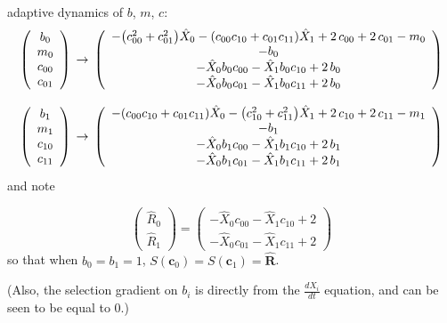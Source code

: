 \documentclass{article}
\begin{document}
adaptive dynamics of $b$, $m$, $c$:
\[\left(\begin{array}{c}
  b_{0}\\
  m_{0}\\
  c_{00}\\
  c_{01}
\end{array}\right)\\
\to\\
\left(\begin{array}{c}
  -{\left({c}_{00}^{2} + {c}_{01}^{2}\right)} \hat{X}_{0} - {\left({c}_{00} {c}_{10} + {c}_{01} {c}_{11}\right)} \hat{X}_{1} + 2 \, {c}_{00} + 2 \, {c}_{01} - m_{0}\\
  -b_{0}\\
  -\hat{X}_{0} b_{0} {c}_{00} - \hat{X}_{1} b_{0} {c}_{10} + 2 \, b_{0}\\
  -\hat{X}_{0} b_{0} {c}_{01} - \hat{X}_{1} b_{0} {c}_{11} + 2 \, b_{0}
\end{array}\right)\]

\[\left(\begin{array}{c}
  b_{1}\\
  m_{1}\\
  c_{10}\\
  c_{11}
\end{array}\right)\\
\to\\
\left(\begin{array}{c}
  -{\left({c}_{00} {c}_{10} + {c}_{01} {c}_{11}\right)} \hat{X}_{0} - {\left({c}_{10}^{2} + {c}_{11}^{2}\right)} \hat{X}_{1} + 2 \, {c}_{10} + 2 \, {c}_{11} - m_{1}\\
  -b_{1}\\
  -\hat{X}_{0} b_{1} {c}_{00} - \hat{X}_{1} b_{1} {c}_{10} + 2 \, b_{1}\\
  -\hat{X}_{0} b_{1} {c}_{01} - \hat{X}_{1} b_{1} {c}_{11} + 2 \, b_{1}
\end{array}\right)\]
and note

\[
  \left(\begin{array}{c}
  \hat{R}_{0}\\
  \hat{R}_{1}
\end{array}\right) = \left(\begin{array}{c}
  -\hat{X}_{0} {c}_{00} - \hat{X}_{1} {c}_{10} + 2\\
  -\hat{X}_{0} {c}_{01} - \hat{X}_{1} {c}_{11} + 2
\end{array}\right)
\]
so that when $b_0=b_1=1$, $S(\mathbf{c}_0)=S(\mathbf{c}_1)=\hat{\mathbf{R}}$.

(Also, the selection gradient on $b_i$ is directly from the $\frac{dX_i}{dt}$ equation, and can be seen to be equal to 0.)
\end{document}
